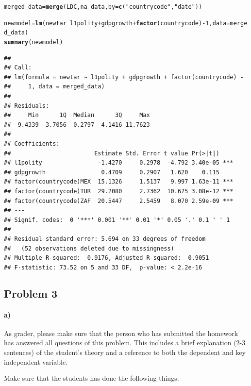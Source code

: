 \documentclass[12pt]{article}\usepackage[]{graphicx}\usepackage[]{color}
\makeatletter
\newcommand{\hlnum}[1]{\textcolor[rgb]{0.686,0.059,0.569}{#1}}%
\newcommand{\hlstr}[1]{\textcolor[rgb]{0.192,0.494,0.8}{#1}}%
\newcommand{\hlopt}[1]{\textcolor[rgb]{0,0,0}{#1}}%
\newcommand{\hlstd}[1]{\textcolor[rgb]{0.345,0.345,0.345}{#1}}%
\newcommand{\hlkwb}[1]{\textcolor[rgb]{0.69,0.353,0.396}{#1}}%
\newcommand{\hlkwc}[1]{\textcolor[rgb]{0.333,0.667,0.333}{#1}}%
\newcommand{\hlkwd}[1]{\textcolor[rgb]{0.737,0.353,0.396}{\textbf{#1}}}%
\newenvironment{kframe}{%
 \def\at@end@of@kframe{}%
 \ifinner\ifhmode%
  \def\at@end@of@kframe{\end{minipage}}%
  \begin{minipage}{\columnwidth}%
 \fi\fi%
 \def\FrameCommand##1{\hskip\@totalleftmargin \hskip-\fboxsep
 \colorbox{shadecolor}{##1}\hskip-\fboxsep
     \hskip-\linewidth \hskip-\@totalleftmargin \hskip\columnwidth}%
 \MakeFramed {\advance\hsize-\width
   \@totalleftmargin\z@ \linewidth\hsize
   \@setminipage}}%
 {\par\unskip\endMakeFramed%
 \at@end@of@kframe}
\newenvironment{knitrout}{}{} %
\makeatother
\begin{document}
\begin{knitrout}
\begin{kframe}
\begin{alltt}
\hlstd{merged_data} \hlkwb{=} \hlkwd{merge}\hlstd{(LDC, na_data,} \hlkwc{by} \hlstd{=} \hlkwd{c}\hlstd{(}\hlstr{"countrycode"}\hlstd{,} \hlstr{"date"}\hlstd{))}

\hlstd{newmodel} \hlkwb{=} \hlkwd{lm}\hlstd{(newtar} \hlopt{~} \hlstd{l1polity} \hlopt{+} \hlstd{gdpgrowth} \hlopt{+} \hlkwd{factor}\hlstd{(countrycode)} \hlopt{-} \hlnum{1}\hlstd{,} \hlkwc{data} \hlstd{= merged_data)}
\hlkwd{summary}\hlstd{(newmodel)}
\end{alltt}
\begin{verbatim}
## 
## Call:
## lm(formula = newtar ~ l1polity + gdpgrowth + factor(countrycode) - 
##     1, data = merged_data)
## 
## Residuals:
##     Min      1Q  Median      3Q     Max 
## -9.4339 -3.7056 -0.2797  4.1416 11.7623 
## 
## Coefficients:
##                        Estimate Std. Error t value Pr(>|t|)    
## l1polity                -1.4270     0.2978  -4.792 3.40e-05 ***
## gdpgrowth                0.4709     0.2907   1.620    0.115    
## factor(countrycode)MEX  15.1326     1.5137   9.997 1.63e-11 ***
## factor(countrycode)TUR  29.2080     2.7362  10.675 3.08e-12 ***
## factor(countrycode)ZAF  20.5447     2.5459   8.070 2.59e-09 ***
## ---
## Signif. codes:  0 '***' 0.001 '**' 0.01 '*' 0.05 '.' 0.1 ' ' 1
## 
## Residual standard error: 5.694 on 33 degrees of freedom
##   (52 observations deleted due to missingness)
## Multiple R-squared:  0.9176,	Adjusted R-squared:  0.9051 
## F-statistic: 73.52 on 5 and 33 DF,  p-value: < 2.2e-16
\end{verbatim}
\end{kframe}
\end{knitrout}



\subsection*{Problem 3}

\paragraph*{a)} As grader, please make sure that the person who has submitted the homework has answered all questions of this problem. This includes a brief explanation (2-3 sentences) of the student's theory and a reference to both the dependent and key independent variable.

Make sure that the students has done the following things:
\end{document}
